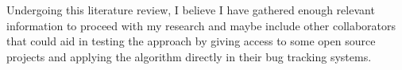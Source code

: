 \documentclass[11pt,english,twocolumn]{article}
\begin{document}
Undergoing this literature review, I believe I have gathered enough relevant 
information to proceed with my research and maybe include other collaborators that 
could aid in testing the approach by giving access to some open source projects and
applying the algorithm directly in their bug tracking systems.


\let\oldbibliography\thebibliography
\renewcommand{\thebibliography}[1]{\oldbibliography{#1}
\setlength{\itemsep}{-3pt}}


{
\scriptsize

}
\end{document}
